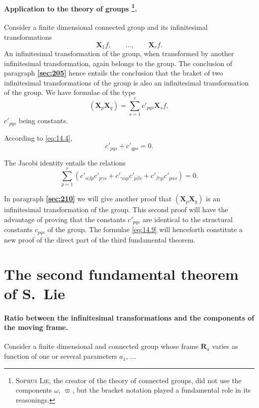 \documentclass[leqno,11pt]{book}
\numberwithin{equation}{chapter}
\theoremstyle{shape1}
\theoremstyle{shapesmall}
\newcommand{\fsref}[1]{{\rm\textsection\textbf{\ref{sec:#1}}}}
\newcommand{\vp}{\varpi}
\begin{document}
\paragraph[{Application to the theory of groups.}]{Application to the theory of groups \footnote{\textsc{Sophus Lie}, the creator of the theory of connected groups, did not use the components $\omega$, $\vp$, but the bracket notation played a fundamental role in its reasonings.}.}
\label{sec:207}
Consider a finite dimensional connected group and its infinitesimal transformations
\[
\mathbf{X}_{1}f,\qquad\dots,\qquad \mathbf{X}_{r}f.
\]
An infinitesimal transformation of the group, when transformed by another infinitesimal transformation, again belongs to the group. The conclusion of paragraph \fsref{205} hence entails the conclusion that the braket of two infinitesimal transformations of the group is also an infinitesimal transformation of the group. We have formulae of the type
\begin{equation}
  \label{eq:14.7}
  (\mathbf{X}_{p}\mathbf{X}_{q})=\sum_{s=1}^{r}c'_{pqs}\mathbf{X}_{s}f,
\end{equation}
$c'_{pqs}$ being constants.

According to \eqref{eq:14.4},
\begin{equation}
  \label{eq:14.8}
  c'_{pqs}+c'_{qps}=0.
\end{equation}

The Jacobi identity entails the relations
\begin{equation}
  \label{eq:14.9}
  \sum_{p=1}^{r}(c'_{\alpha\beta p}c'_{p\gamma s}+c'_{\gamma\alpha p}c'_{p\beta s}+c'_{\beta\gamma p}c'_{p\alpha s})=0.
\end{equation}

In paragraph \fsref{210} we will give another proof that $(\mathbf{X}_{p}\mathbf{X}_{q})$ is an infinitesimal transformation of the group. This second proof will have the advantage of proving that the constants $c'_{pqs}$ are identical to the structural constants $c_{pqs}$ of the group. The formulae \eqref{eq:14.9} will henceforth constitute a new proof of the direct part of the third fundamental theorem.

\section{The second fundamental theorem of S.~Lie}
\label{sec:two-fund-theor}

\paragraph{Ratio between the infinitesimal transformations and the components of the moving frame.}
\label{sec:208}
Consider a finite dimensional and connected group whose frame $\mathbf{R}_{a}$ varies as function of one or several parameters $a_{1}$, $\dots$
\end{document}
